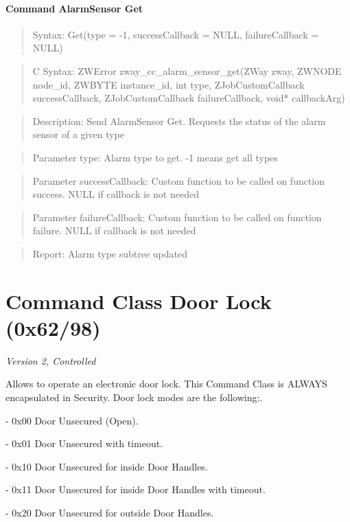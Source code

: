 \paragraph{Command AlarmSensor Get}
\begin{quote}Syntax: Get(type = -1, successCallback = NULL, failureCallback = NULL)\end{quote}
\begin{quote}C Syntax: ZWError zway\_cc\_alarm\_sensor\_get(ZWay zway, ZWNODE node\_id, ZWBYTE instance\_id, int type, ZJobCustomCallback successCallback, ZJobCustomCallback failureCallback, void* callbackArg)\end{quote}
\begin{quote}Description: Send AlarmSensor Get. Requests the status of the alarm sensor of a given type\end{quote}
\begin{quote}Parameter type: Alarm type to get. -1 means get all types\end{quote}
\begin{quote}Parameter successCallback: Custom function to be called on function success. NULL if callback is not needed\end{quote}
\begin{quote}Parameter failureCallback: Custom function to be called on function failure. NULL if callback is not needed\end{quote}
\begin{quote}Report: Alarm type subtree updated\end{quote}


\section{Command Class Door Lock (0x62/98)}

\textit{Version 2, Controlled}
\newline

Allows to operate an electronic door lock. This Command Class is ALWAYS encapsulated in Security. Door lock modes are the following:. 

- 0x00 Door Unsecured (Open). 

- 0x01 Door Unsecured with timeout. 

- 0x10 Door Unsecured for inside Door Handles. 

- 0x11 Door Unsecured for inside Door Handles with timeout. 

- 0x20 Door Unsecured for outside Door Handles. 

